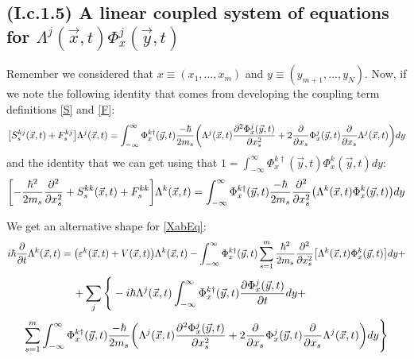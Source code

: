 \documentclass[11pt, a4paper]{article} %
\begin{document}
\subsection*{(I.c.1.5) A linear coupled system of equations for $\Lambda^j(\vec{x},t) \Phi^j_x(\vec{y},t)$ }
\vspace{-0.3cm}

Remember we considered that $x\equiv (x_1,...,x_m)$ and $y\equiv (y_{m+1},...,y_N)$. Now, if we note the following identity that comes from developing the coupling term definitions \eqref{S} and \eqref{F}:
\begin{equation}
\qty[S^{kj}_s(\vec{x},t)+F_s^{kj}]\Lambda^j(\vec{x},t)=\int_{-\infty}^\infty \Phi^{k\dagger}_x(\vec{y},t) \frac{-\hbar}{2m_s}\qty( \Lambda^j(\vec{x},t)\pdv[2]{\Phi^j_x(\vec{y},t)}{x_s}+2\pdv{}{x_s}\Phi^j_x(\vec{y},t)\pdv{}{x_s}\Lambda^j(\vec{x},t) ) dy
\end{equation}
and the identity that we can get using that $1=\int_{-\infty}^\infty \Phi^{k\dagger}_x(\vec{y},t) \Phi^k_x(\vec{y},t)dy$:
\begin{equation}
\qty[-\frac{\hbar^2}{2m_s}\pdv[2]{}{x_s}+S^{kk}_s(\vec{x},t)+F_s^{kk}]\Lambda^k(\vec{x},t)=\int_{-\infty}^\infty \Phi^{k\dagger}_x(\vec{y},t) \frac{-\hbar}{2m_s} \pdv[2]{}{x_s}\qty(\Lambda^k(\vec{x},t)\Phi^k_x(\vec{y},t))dy
\end{equation}

We get an alternative shape for \eqref{XabEq}:
\begin{equation}
i\hbar \pdv{}{t}\Lambda^k(\vec{x},t)=\qty( \varepsilon^k(\vec{x},t)+V(\vec{x},t) )\Lambda^k(\vec{x},t) -\int_{-\infty}^\infty \Phi^{k\dagger}_x(\vec{y},t) \sum_{s=1}^m\frac{\hbar^2}{2m_s}\pdv[2]{}{x_s}\qty[\Lambda^k(\vec{x},t)\Phi^k_x(\vec{y},t) ]dy+
\end{equation}
$$
\hspace*{-1cm}
    +\sum_j\Bigg\{-i\hbar \Lambda^j(\vec{x},t)\int_{-\infty}^\infty \Phi^{k\dagger}_x(\vec{y},t)\pdv{\Phi^j_x(\vec{y},t)}{t}dy+
$$
$$
\sum_{s=1}^m\int_{-\infty}^\infty \Phi^{k\dagger}_x(\vec{y},t) \frac{-\hbar}{2m_s}\qty( \Lambda^j(\vec{x},t)\pdv[2]{\Phi^j_x(\vec{y},t)}{x_s}+2\pdv{}{x_s}\Phi^j_x(\vec{y},t)\pdv{}{x_s}\Lambda^j(\vec{x},t) ) dy\Bigg\}
$$
\end{document}
